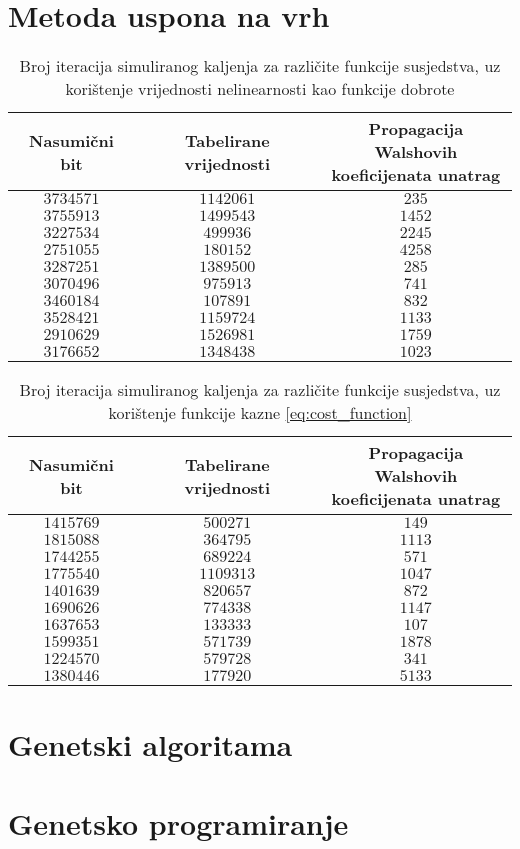 \section{Metoda uspona na vrh}
\begin{table}[]
    \centering
    \begin{tabular}{ccc}
        Nasumični bit & Tabelirane vrijednosti & \makecell{Propagacija Walshovih \\ koeficijenata unatrag} \\ \hline
        $3 734 571$ & $1 142 061$ &   $235$ \\
        $3 755 913$ & $1 499 543$ & $1 452$ \\
        $3 227 534$ &   $499 936$ & $2 245$ \\
        $2 751 055$ &   $180 152$ & $4 258$ \\
        $3 287 251$ & $1 389 500$ &   $285$ \\
        $3 070 496$ &   $975 913$ &   $741$ \\
        $3 460 184$ &   $107 891$ &   $832$ \\
        $3 528 421$ & $1 159 724$ & $1 133$ \\
        $2 910 629$ & $1 526 981$ & $1 759$ \\
        $3 176 652$ & $1 348 438$ & $1 023$
    \end{tabular}
    \captionsetup{justification=centering}
    \caption{Broj iteracija simuliranog kaljenja za različite funkcije susjedstva, uz korištenje vrijednosti nelinearnosti kao funkcije dobrote}
    \label{tbl:simaneal_6_nonl}
\end{table}

\begin{table}[]
    \centering
    \begin{tabular}{ccc}
        Nasumični bit & Tabelirane vrijednosti & \makecell{Propagacija Walshovih \\ koeficijenata unatrag} \\ \hline
        $1 415 769$ &   $500 271$ &   $149$ \\
        $1 815 088$ &   $364 795$ & $1 113$ \\
        $1 744 255$ &   $689 224$ &   $571$ \\
        $1 775 540$ & $1 109 313$ & $1 047$ \\
        $1 401 639$ &   $820 657$ &   $872$ \\
        $1 690 626$ &   $774 338$ & $1 147$ \\
        $1 637 653$ &   $133 333$ &   $107$ \\
        $1 599 351$ &   $571 739$ & $1 878$ \\
        $1 224 570$ &   $579 728$ &   $341$ \\
        $1 380 446$ &   $177 920$ & $5 133$
    \end{tabular}
    \captionsetup{justification=centering}
    \caption{Broj iteracija simuliranog kaljenja za različite funkcije susjedstva, uz korištenje funkcije kazne \eqref{eq:cost_function}}
    \label{tbl:simaneal_6_walshe}
\end{table}


\section{Genetski algoritama}
\section{Genetsko programiranje} 